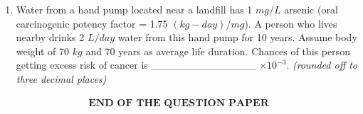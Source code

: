 \documentclass[journal]{IEEEtran}
\begin{document}
\begin{enumerate}[resume]
\item Water from a hand pump located near a landfill has 1 $mg/L$ arsenic (oral carcinogenic potency factor = 1.75 $(kg-day)/mg$). A person who lives nearby drinks 2 $L/day$ water from this hand pump for 10 years. Assume body weight of 70 $kg$ and 70 years as average life duration. Chances of this person getting excess risk of cancer is \_\_\_\_\_\_\_\_\_\_\_\_\_\_ $\times 10^{-3}$. \textit{(rounded off to three decimal places)} \hfill{}

\end{enumerate}

\bigskip
\begin{align*}
\textbf{END OF THE QUESTION PAPER}
\end{align*}
\end{document}

